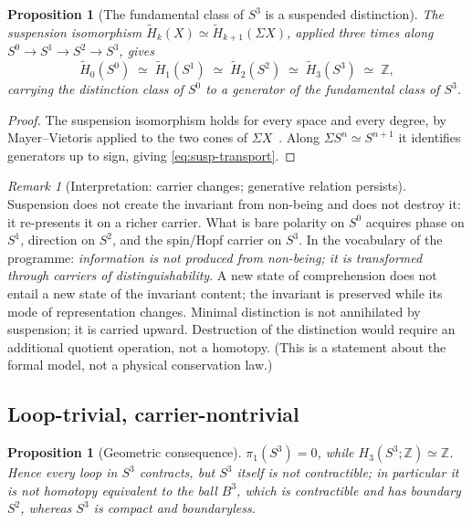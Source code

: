 \documentclass[11pt,a4paper]{article}
\newtheorem{proposition}[theorem]{Proposition}
\theoremstyle{definition}
\theoremstyle{remark}
\newtheorem{remark}[theorem]{Remark}
\newcommand{\Sn}[1]{S^{#1}}
\newcommand{\Szero}{S^{0}}
\newcommand{\Sone}{S^{1}}
\newcommand{\Stwo}{S^{2}}
\newcommand{\Sthree}{S^{3}}
\newcommand{\Z}{\mathbb{Z}}
\begin{document}
\begin{proposition}[The fundamental class of $\Sthree$ is a suspended distinction]
\label{prop:susp-class}
The suspension isomorphism $\widetilde H_{k}(X)\simeq\widetilde H_{k+1}(\Sigma X)$, applied
three times along $\Szero\to\Sone\to\Stwo\to\Sthree$, gives
\begin{equation}
\widetilde H_{0}(\Szero)\;\simeq\;\widetilde H_{1}(\Sone)\;\simeq\;
\widetilde H_{2}(\Stwo)\;\simeq\;\widetilde H_{3}(\Sthree)\;\simeq\;\Z,
\label{eq:susp-transport}
\end{equation}
carrying the distinction class of $\Szero$ to a generator of the fundamental class of
$\Sthree$.
\end{proposition}

\begin{proof}
The suspension isomorphism holds for every space and every degree, by Mayer--Vietoris applied
to the two cones of $\Sigma X$~\cite{Hatcher2002}.  Along $\Sigma\Sn{n}\simeq\Sn{n+1}$ it
identifies generators up to sign, giving \eqref{eq:susp-transport}.
\end{proof}

\begin{remark}[Interpretation: carrier changes; generative relation persists]
Suspension does not create the invariant from non-being and does not destroy it: it re-presents
it on a richer carrier.  What is bare polarity on $\Szero$ acquires phase on $\Sone$, direction
on $\Stwo$, and the spin/Hopf carrier on $\Sthree$.  In the vocabulary of the programme:
\emph{information is not produced from non-being; it is transformed through carriers of
distinguishability}.  A new state of comprehension does not entail a new state of the invariant
content; the invariant is preserved while its mode of representation changes.  Minimal
distinction is not annihilated by suspension; it is carried upward.  Destruction of the
distinction would require an additional quotient operation, not a homotopy.  (This is a
statement about the formal model, not a physical conservation law.)
\end{remark}

\subsection{Loop-trivial, carrier-nontrivial}

\begin{proposition}[Geometric consequence]
\label{prop:loop-carrier}
$\pi_{1}(\Sthree)=0$, while $H_{3}(\Sthree;\Z)\simeq\Z$.  Hence every loop in $\Sthree$
contracts, but $\Sthree$ itself is not contractible; in particular it is not homotopy equivalent
to the ball $B^{3}$, which is contractible and has boundary $\Stwo$, whereas $\Sthree$ is
compact and boundaryless.
\end{proposition}
\end{document}
